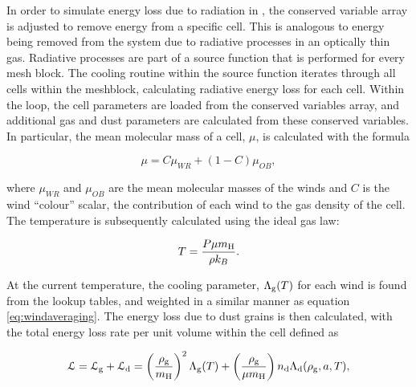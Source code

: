In order to simulate energy loss due to radiation in \athena{}, the conserved variable array is adjusted to remove energy from a specific cell.
This is analogous to energy being removed from the system due to radiative processes in an optically thin gas.
Radiative processes are part of a source function that is performed for every mesh block.
The cooling routine within the source function iterates through all cells within the meshblock, calculating radiative energy loss for each cell.
Within the loop, the cell parameters are loaded from the conserved variables array, and additional gas and dust parameters are calculated from these conserved variables.
In particular, the mean molecular mass of a cell, $\mu$, is calculated with the formula

\begin{equation}
  \mu = C\mu_{WR} + (1-C) \mu_{OB}, \label{eq:windaveraging}
\end{equation}

\noindent
where $\mu_{WR}$ and $\mu_{OB}$ are the mean molecular masses of the winds and $C$ is the wind ``colour'' scalar, the contribution of each wind to the gas density of the cell.
The temperature is subsequently calculated using the ideal gas law:

\begin{equation}
  \label{eq:c3-idealgas}
  T = \frac{P \mu m_\text{H}}{\rho k_B}.
\end{equation}

\noindent
At the current temperature, the cooling parameter, $\Lambda_\text{g}(T)$ for each wind is found from the lookup tables, and weighted in a similar manner as equation \ref{eq:windaveraging}. The energy loss due to dust grains is then calculated, with the total energy loss rate per unit volume within the cell defined as


\begin{equation}
  \label{eq:c3-energyloss}
  \mathcal{L} = \mathcal{L}_\text{g} + \mathcal{L}_\text{d} = \left(\frac{\rho_\text{g}}{m_\text{H}}\right)^2 \Lambda_\text{g}(T) + \left(\frac{\rho_\text{g}}{\mu m_\text{H}}\right) n_\text{d} \Lambda_\text{d}(\rho_\text{g},a,T),
\end{equation}

